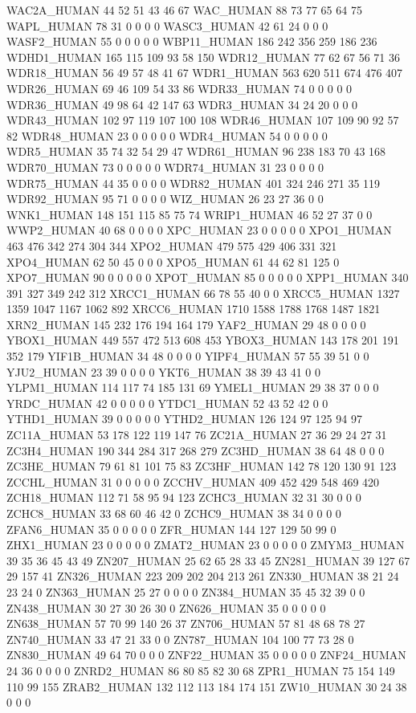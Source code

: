 WAC2A_HUMAN	44	52	51	43	46	67
WAC_HUMAN	88	73	77	65	64	75
WAPL_HUMAN	78	31	0	0	0	0
WASC3_HUMAN	42	61	24	0	0	0
WASF2_HUMAN	55	0	0	0	0	0
WBP11_HUMAN	186	242	356	259	186	236
WDHD1_HUMAN	165	115	109	93	58	150
WDR12_HUMAN	77	62	67	56	71	36
WDR18_HUMAN	56	49	57	48	41	67
WDR1_HUMAN	563	620	511	674	476	407
WDR26_HUMAN	69	46	109	54	33	86
WDR33_HUMAN	74	0	0	0	0	0
WDR36_HUMAN	49	98	64	42	147	63
WDR3_HUMAN	34	24	20	0	0	0
WDR43_HUMAN	102	97	119	107	100	108
WDR46_HUMAN	107	109	90	92	57	82
WDR48_HUMAN	23	0	0	0	0	0
WDR4_HUMAN	54	0	0	0	0	0
WDR5_HUMAN	35	74	32	54	29	47
WDR61_HUMAN	96	238	183	70	43	168
WDR70_HUMAN	73	0	0	0	0	0
WDR74_HUMAN	31	23	0	0	0	0
WDR75_HUMAN	44	35	0	0	0	0
WDR82_HUMAN	401	324	246	271	35	119
WDR92_HUMAN	95	71	0	0	0	0
WIZ_HUMAN	26	23	27	36	0	0
WNK1_HUMAN	148	151	115	85	75	74
WRIP1_HUMAN	46	52	27	37	0	0
WWP2_HUMAN	40	68	0	0	0	0
XPC_HUMAN	23	0	0	0	0	0
XPO1_HUMAN	463	476	342	274	304	344
XPO2_HUMAN	479	575	429	406	331	321
XPO4_HUMAN	62	50	45	0	0	0
XPO5_HUMAN	61	44	62	81	125	0
XPO7_HUMAN	90	0	0	0	0	0
XPOT_HUMAN	85	0	0	0	0	0
XPP1_HUMAN	340	391	327	349	242	312
XRCC1_HUMAN	66	78	55	40	0	0
XRCC5_HUMAN	1327	1359	1047	1167	1062	892
XRCC6_HUMAN	1710	1588	1788	1768	1487	1821
XRN2_HUMAN	145	232	176	194	164	179
YAF2_HUMAN	29	48	0	0	0	0
YBOX1_HUMAN	449	557	472	513	608	453
YBOX3_HUMAN	143	178	201	191	352	179
YIF1B_HUMAN	34	48	0	0	0	0
YIPF4_HUMAN	57	55	39	51	0	0
YJU2_HUMAN	23	39	0	0	0	0
YKT6_HUMAN	38	39	43	41	0	0
YLPM1_HUMAN	114	117	74	185	131	69
YMEL1_HUMAN	29	38	37	0	0	0
YRDC_HUMAN	42	0	0	0	0	0
YTDC1_HUMAN	52	43	52	42	0	0
YTHD1_HUMAN	39	0	0	0	0	0
YTHD2_HUMAN	126	124	97	125	94	97
ZC11A_HUMAN	53	178	122	119	147	76
ZC21A_HUMAN	27	36	29	24	27	31
ZC3H4_HUMAN	190	344	284	317	268	279
ZC3HD_HUMAN	38	64	48	0	0	0
ZC3HE_HUMAN	79	61	81	101	75	83
ZC3HF_HUMAN	142	78	120	130	91	123
ZCCHL_HUMAN	31	0	0	0	0	0
ZCCHV_HUMAN	409	452	429	548	469	420
ZCH18_HUMAN	112	71	58	95	94	123
ZCHC3_HUMAN	32	31	30	0	0	0
ZCHC8_HUMAN	33	68	60	46	42	0
ZCHC9_HUMAN	38	34	0	0	0	0
ZFAN6_HUMAN	35	0	0	0	0	0
ZFR_HUMAN	144	127	129	50	99	0
ZHX1_HUMAN	23	0	0	0	0	0
ZMAT2_HUMAN	23	0	0	0	0	0
ZMYM3_HUMAN	39	35	36	45	43	49
ZN207_HUMAN	25	62	65	28	33	45
ZN281_HUMAN	39	127	67	29	157	41
ZN326_HUMAN	223	209	202	204	213	261
ZN330_HUMAN	38	21	24	23	24	0
ZN363_HUMAN	25	27	0	0	0	0
ZN384_HUMAN	35	45	32	39	0	0
ZN438_HUMAN	30	27	30	26	30	0
ZN626_HUMAN	35	0	0	0	0	0
ZN638_HUMAN	57	70	99	140	26	37
ZN706_HUMAN	57	81	48	68	78	27
ZN740_HUMAN	33	47	21	33	0	0
ZN787_HUMAN	104	100	77	73	28	0
ZN830_HUMAN	49	64	70	0	0	0
ZNF22_HUMAN	35	0	0	0	0	0
ZNF24_HUMAN	24	36	0	0	0	0
ZNRD2_HUMAN	86	80	85	82	30	68
ZPR1_HUMAN	75	154	149	110	99	155
ZRAB2_HUMAN	132	112	113	184	174	151
ZW10_HUMAN	30	24	38	0	0	0
